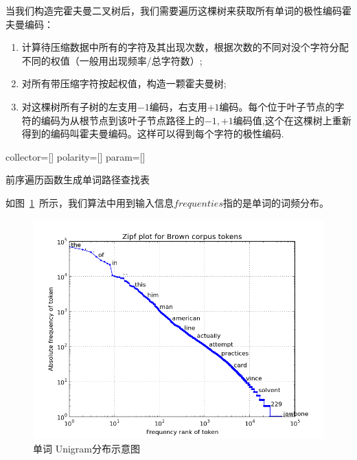 当我们构造完霍夫曼二叉树后，我们需要遍历这棵树来获取所有单词的极性编码霍夫曼编码：
\begin{enumerate}
  \item 计算待压缩数据中所有的字符及其出现次数，根据次数的不同对没个字符分配不同的权值（一般用出现频率/总字符数）;
  \item 对所有带压缩字符按起权值，构造一颗霍夫曼树;
  \item 对这棵树所有子树的左支用$-1$编码，右支用$+1$编码。每个位于叶子节点的字符的编码为从根节点到该叶子节点路径上的$-1,+1$编码值,这个在这棵树上重新得到的编码叫霍夫曼编码。这样可以得到每个字符的极性编码.
\end{enumerate}
\begin{algorithm}[!ht]
\SetAlgoLined
{}
collector=[]\;
polarity=[]\;
 param=[]\;
\caption{前序遍历函数生成单词路径查找表}\label{code:preorder}
\end{algorithm}
如图~\ref{fig:zipf}~所示，我们算法中用到输入信息$frequenties$指的是单词的词频分布。
\begin{figure}[!ht]
  \centering
\includegraphics[width=1\linewidth]{./figures/zipf.png}
\caption{单词 Unigram分布示意图}\label{fig:zipf}
\end{figure}

